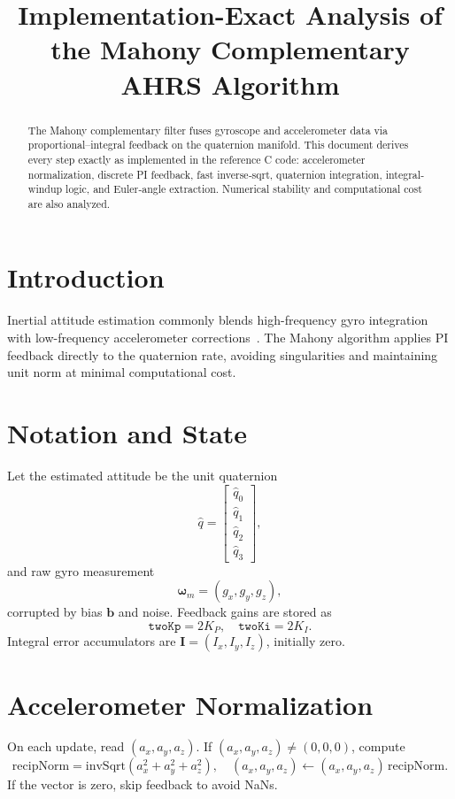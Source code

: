 \documentclass[12pt]{article}
\title{Implementation-Exact Analysis of the Mahony Complementary AHRS Algorithm}
\date{}
\begin{document}
\maketitle

\begin{abstract}
The Mahony complementary filter fuses gyroscope and accelerometer data via proportional–integral feedback on the quaternion manifold.  This document derives every step exactly as implemented in the reference C code: accelerometer normalization, discrete PI feedback, fast inverse‐sqrt, quaternion integration, integral‐windup logic, and Euler‐angle extraction.  Numerical stability and computational cost are also analyzed.
\end{abstract}

\section{Introduction}
Inertial attitude estimation commonly blends high-frequency gyro integration with low-frequency accelerometer corrections~\cite{Mahony2008}.  The Mahony algorithm applies PI feedback directly to the quaternion rate, avoiding singularities and maintaining unit norm at minimal computational cost.

\section{Notation and State}
Let the estimated attitude be the unit quaternion 
\[
\hat q = \begin{bmatrix}\hat q_0\\\hat q_1\\\hat q_2\\\hat q_3\end{bmatrix},
\]
and raw gyro measurement 
\[
\boldsymbol\omega_m = (g_x,g_y,g_z),
\]
corrupted by bias $\mathbf b$ and noise.  Feedback gains are stored as 
\[
\texttt{twoKp} = 2K_P,\quad \texttt{twoKi} = 2K_I.
\]
Integral error accumulators are 
\(\mathbf I=(I_x,I_y,I_z)\), initially zero.

\section{Accelerometer Normalization}
On each update, read $(a_x,a_y,a_z)$.  If $(a_x,a_y,a_z)\neq(0,0,0)$, compute
\[
\text{recipNorm} = \mathrm{invSqrt}(a_x^2+a_y^2+a_z^2),
\quad
(a_x,a_y,a_z)\leftarrow (a_x,a_y,a_z)\,\text{recipNorm}.
\]
If the vector is zero, skip feedback to avoid NaNs.
\end{document}
